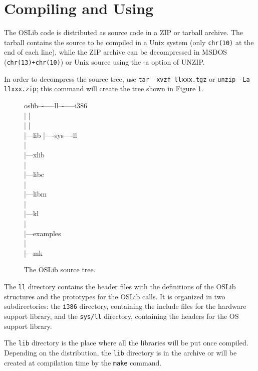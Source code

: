 \documentclass[a4paper]{report}
\begin{document}
\section{Compiling and Using}
The OSLib code is distributed as source code in a ZIP or tarball
archive. The tarball contains the source to be compiled in a Unix
system (only  {\tt chr(10)} at the end of each line), while the ZIP
archive can be decompressed in MSDOS ({\tt chr(13)+chr(10)}) or Unix
source using the -a option of UNZIP.

In order to decompress the source tree, use {\tt tar -xvzf llxxx.tgz}
or {\tt unzip -La llxxx.zip}; this command will create the tree shown in
Figure \ref{fig:tree}.

\begin{figure}
\begin{tt}
\begin{tabbing}
oslib--\=------ll--\=------i386		\\
\>	| \>		|			\\
\>	| \>		|			\\
\>	|---lib	\>	|----sys----ll		\\
\>	|					\\
\>	|---xlib \>				\\
\>	| \>					\\
\>	|---libc \>				\\
\>	| \>					\\
\>	|---libm \>				\\
\>	|					\\
\>	|---kl					\\
\>	|					\\
\>	|---examples				\\
\>	|					\\
\>	|---mk					\\
\end{tabbing}
\end{tt}
\caption{The OSLib source tree.}
\label{fig:tree}
\end{figure}

The {\tt ll} directory contains the header files with the
definitions of the OSLib structures and the prototypes for the OSLib calls.
It is organized in two subdirectories: the {\tt i386} directory,
containing the include files for the hardware support library, and
the {\tt sys/ll} directory, containing the headers for the OS support
library.

The {\tt lib} directory is the place where all the libraries
will be put once compiled. Depending on the
distribution, the {\tt lib} directory is in the archive or will be
created at compilation time by the {\tt make} command.
\end{document}
